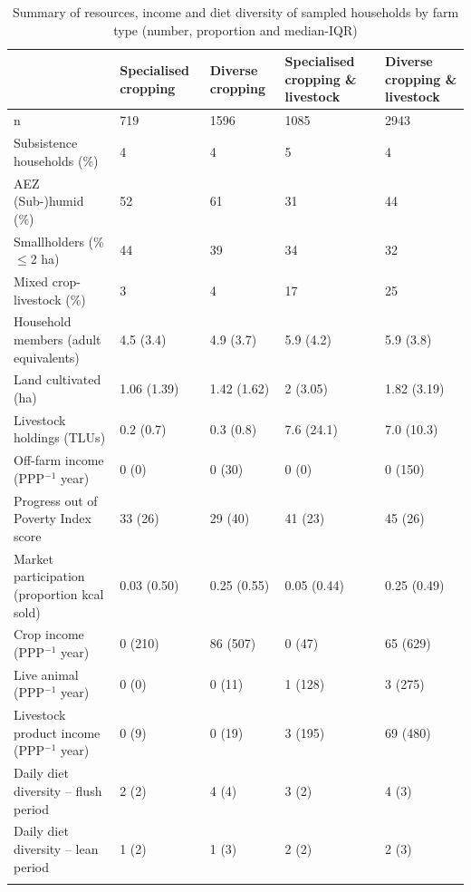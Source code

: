 \begin{table}[H]
  \captionsetup{singlelinecheck = false, justification=justified} %
  \caption{
  Summary of resources, income and diet diversity of sampled households by farm type (number, proportion and median-IQR)
  }
  \label{tab:06_4}
  \small
\begin{tabularx}{\textwidth}{@{}lYYYY@{}}
\toprule
 & Specialised cropping & Diverse cropping & Specialised cropping \& livestock & Diverse cropping \& livestock\\
 \midrule
n & 719 & 1596 & 1085 & 2943\\
Subsistence households (\%) & 4 & 4 & 5 & 4 \\
AEZ (Sub-)humid (\%) & 52 & 61 & 31 & 44 \\
Smallholders (\% ${\leq}$2 ha) & 44 & 39 & 34 & 32 \\
Mixed crop-livestock (\%) & 3 & 4 & 17 & 25 \\
Household members (adult equivalents) & 4.5 (3.4) & 4.9 (3.7) & 5.9 (4.2) & 5.9 (3.8)  \\
\midrule
Land cultivated (ha) & 1.06 (1.39) & 1.42 (1.62) & 2 (3.05) & 1.82 (3.19) \\
Livestock holdings (TLUs) & 0.2 (0.7) & 0.3 (0.8) & 7.6 (24.1) & 7.0 (10.3)  \\
Off-farm income (PPP$^{-1}$ year) & 0 (0) & 0 (30) & 0 (0) & 0 (150)  \\
Progress out of Poverty Index score & 33 (26) & 29 (40) & 41 (23) & 45 (26)  \\
Market participation (proportion kcal sold) & 0.03 (0.50) & 0.25 (0.55) & 0.05 (0.44) & 0.25 (0.49) \\
Crop income (PPP$^{-1}$ year) & 0 (210) & 86 (507) & 0 (47) & 65 (629)  \\
Live animal (PPP$^{-1}$ year) & 0 (0) & 0 (11) & 1 (128) & 3 (275)  \\
Livestock product income (PPP$^{-1}$ year) & 0 (9) & 0 (19) & 3 (195) & 69 (480)  \\
\midrule
Daily diet diversity -- flush period & 2 (2) & 4 (4) & 3 (2) & 4 (3) \\
Daily diet diversity -- lean period & 1 (2) & 1 (3) & 2 (2) & 2 (3)  \\
\bottomrule
\end{tabularx}
\footnotesize
\raggedright

\end{table}

